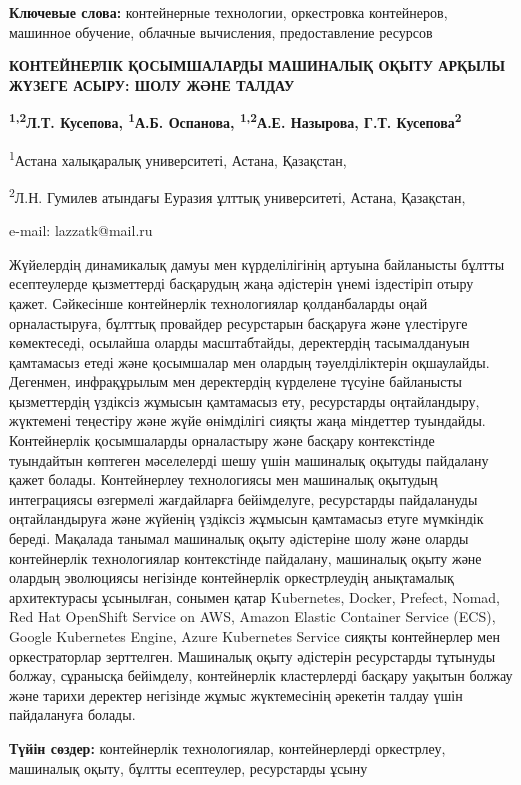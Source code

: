 \textbf{Ключевые слова:} контейнерные технологии, оркестровка
контейнеров, машинное обучение, облачные вычисления, предоставление
ресурсов

\textbf{КОНТЕЙНЕРЛІК ҚОСЫМШАЛАРДЫ МАШИНАЛЫҚ ОҚЫТУ АРҚЫЛЫ ЖҮЗЕГЕ АСЫРУ:
ШОЛУ ЖӘНЕ ТАЛДАУ}

\textbf{\textsuperscript{1,2}Л.Т. Кусепова, \textsuperscript{1}А.Б.
Оспанова, \textsuperscript{1,2}А.Е. Назырова, Г.Т.
Кусепова\textsuperscript{2}}

\textsuperscript{1}Астана халықаралық университеті, Астана, Қазақстан,

\textsuperscript{2}Л.Н. Гумилев атындағы Еуразия ұлттық университеті,
Астана, Қазақстан,

e-mail: lazzatk@mail.ru

Жүйелердің динамикалық дамуы мен күрделілігінің артуына байланысты
бұлтты есептеулерде қызметтерді басқарудың жаңа әдістерін үнемі
іздестіріп отыру қажет. Сәйкесінше контейнерлік технологиялар
қолданбаларды оңай орналастыруға, бұлттық провайдер ресурстарын
басқаруға және үлестіруге көмектеседі, осылайша оларды масштабтайды,
деректердің тасымалдануын қамтамасыз етеді және қосымшалар мен олардың
тәуелділіктерін оқшаулайды. Дегенмен, инфрақұрылым мен деректердің
күрделене түсуіне байланысты қызметтердің үздіксіз жұмысын қамтамасыз
ету, ресурстарды оңтайландыру, жүктемені теңестіру және жүйе өнімділігі
сияқты жаңа міндеттер туындайды. Контейнерлік қосымшаларды орналастыру
және басқару контекстінде туындайтын көптеген мәселелерді шешу үшін
машиналық оқытуды пайдалану қажет болады. Контейнерлеу технологиясы мен
машиналық оқытудың интеграциясы өзгермелі жағдайларға бейімделуге,
ресурстарды пайдалануды оңтайландыруға және жүйенің үздіксіз жұмысын
қамтамасыз етуге мүмкіндік береді. Мақалада танымал машиналық оқыту
әдістеріне шолу және оларды контейнерлік технологиялар контекстінде
пайдалану, машиналық оқыту және олардың эволюциясы негізінде
контейнерлік оркестрлеудің анықтамалық архитектурасы ұсынылған, сонымен
қатар Kubernetes, Docker, Prefect, Nomad, Red Hat OpenShift Service on
AWS, Amazon Elastic Container Service (ECS), Google Kubernetes Engine,
Azure Kubernetes Service сияқты контейнерлер мен оркестраторлар
зерттелген. Машиналық оқыту әдістерін ресурстарды тұтынуды болжау,
сұранысқа бейімделу, контейнерлік кластерлерді басқару уақытын болжау
және тарихи деректер негізінде жұмыс жүктемесінің әрекетін талдау үшін
пайдалануға болады.

\textbf{Түйін сөздер:} контейнерлік технологиялар, контейнерлерді
оркестрлеу, машиналық оқыту, бұлтты есептеулер, ресурстарды ұсыну

